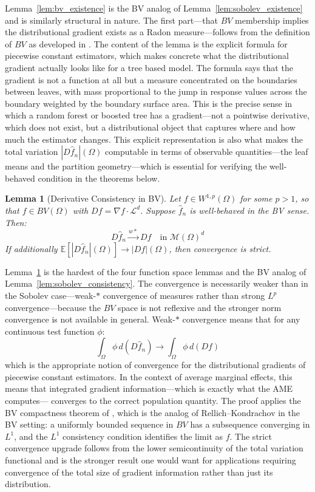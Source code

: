 \documentclass[12pt,a4paper]{article}
\numberwithin{equation}{section}
\theoremstyle{plain}
\newtheorem{lemma}{Lemma}
\theoremstyle{definition}
\newcommand{\E}{\mathbb{E}}
\newcommand{\Wonep}{W^{1,p}(\Omega)}
\newcommand{\BV}{BV(\Omega)}
\newcommand{\cM}{\mathcal{M}(\Omega)^d}
\newcommand{\fn}{\hat{f}_n}
\newcommand{\wstar}{\xrightarrow{w*}}
\begin{document}
	Lemma~\ref{lem:bv_existence} is the BV analog of Lemma~\ref{lem:sobolev_existence}
	and is similarly structural in nature. The first part---that $BV$ membership implies
	the distributional gradient exists as a Radon measure---follows from the definition
	of $BV$ as developed in \citet[Chapter~3]{ambrosio2000bv}. The content of the lemma
	is the explicit formula for piecewise constant estimators, which makes concrete what
	the distributional gradient actually looks like for a tree based model. The formula
	says that the gradient is not a function at all but a measure concentrated on the
	boundaries between leaves, with mass proportional to the jump in response values
	across the boundary weighted by the boundary surface area. This is the precise sense
	in which a random forest or boosted tree has a gradient---not a pointwise derivative,
	which does not exist, but a distributional object that captures where and how much
	the estimator changes. This explicit representation is also what makes the total
	variation $|D\fn|(\Omega)$ computable in terms of observable quantities---the leaf
	means and the partition geometry---which is essential for verifying the well-behaved
	condition in the theorems below.
	
	\begin{lemma}[Derivative Consistency in BV]
		\label{lem:bv_consistency}
		Let $f \in \Wonep$ for some $p > 1$, so that $f \in \BV$ with
		$Df = \nabla f \cdot \mathcal{L}^d$. Suppose $\fn$ is well-behaved in the BV sense.
		Then:
		\begin{equation}
			D\fn \wstar Df \quad \text{in } \cM
		\end{equation}
		If additionally $\E[|D\fn|(\Omega)] \to |Df|(\Omega)$, then convergence is strict.
	\end{lemma}
	
	Lemma~\ref{lem:bv_consistency} is the hardest of the four function space lemmas and
	the BV analog of Lemma~\ref{lem:sobolev_consistency}. The convergence is necessarily
	weaker than in the Sobolev case---weak-$*$ convergence of measures rather than strong
	$L^p$ convergence---because the $BV$ space is not reflexive and the stronger norm
	convergence is not available in general. Weak-$*$ convergence means that for any
	continuous test function $\phi$:
	\begin{equation}
		\int_\Omega \phi \, d(D\fn) \to \int_\Omega \phi \, d(Df)
	\end{equation}
	which is the appropriate notion of convergence for the distributional gradients of
	piecewise constant estimators. In the context of average marginal effects, this means
	that integrated gradient information---which is exactly what the AME computes---
	converges to the correct population quantity. The proof applies the BV compactness
	theorem of \citet[Theorem~3.23]{ambrosio2000bv}, which is the analog of
	Rellich--Kondrachov in the BV setting: a uniformly bounded sequence in $BV$ has a
	subsequence converging in $L^1$, and the $L^1$ consistency condition identifies the
	limit as $f$. The strict convergence upgrade follows from the lower semicontinuity of
	the total variation functional and is the stronger result one would want for
	applications requiring convergence of the total size of gradient information rather
	than just its distribution.
	
\end{document}
